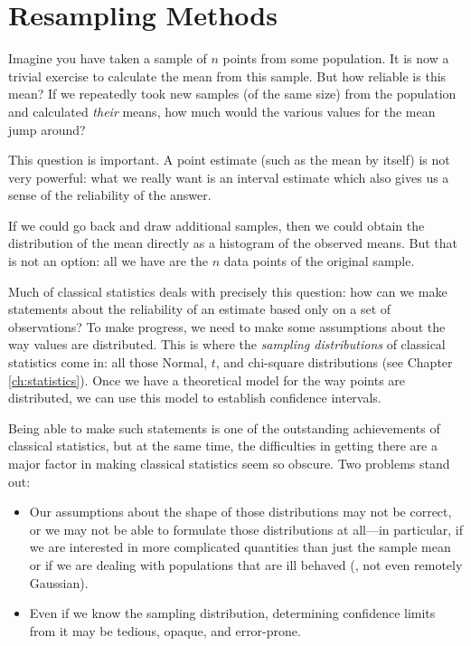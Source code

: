 \section{Resampling Methods}

 
Imagine you have taken a sample of $n$ points from some population.
It is now a trivial exercise to calculate the mean from this sample.
But how reliable is this mean? If we repeatedly took new samples (of
the same size) from the population and calculated \emph{their}
means, how much would the various values for the mean jump around?

This question is important. A point estimate (such as the mean by
itself) is not very powerful: what we really want is an interval
estimate which also gives us a sense of the reliability of the
answer.

If we could go back and draw additional samples, then we could obtain
the distribution of the mean directly as a histogram of the observed
means. But that is not an option: all we have are the $n$ data points
of the original sample.

Much of classical statistics deals with precisely this question: how
can we make statements about the reliability of an estimate based
only on a set of observations? To make progress, we need to make some
assumptions about the way values are distributed. This is where the
\emph{sampling distributions} of classical statistics come in: all
those Normal, $t$, and chi-square distributions (see Chapter
\ref{ch:statistics}). Once we have a theoretical model for the way
points are distributed, we can use this model to establish confidence
intervals.

Being able to make such statements is one of the outstanding
achievements of classical statistics, but at the same time, the
difficulties in getting there are a major factor in making classical
statistics seem so obscure. Two problems stand out:

\begin{itemize}
\item Our assumptions about the shape of those distributions may not
  be correct, or we may not be able to formulate those distributions
  at all---in particular, if we are interested in more complicated
  quantities than just the sample mean or if we are dealing with
  populations that are ill behaved (\ie, not even remotely Gaussian).
\item Even if we know the sampling distribution, determining
  confidence limits from it may be tedious, opaque, and error-prone.
\end{itemize}

